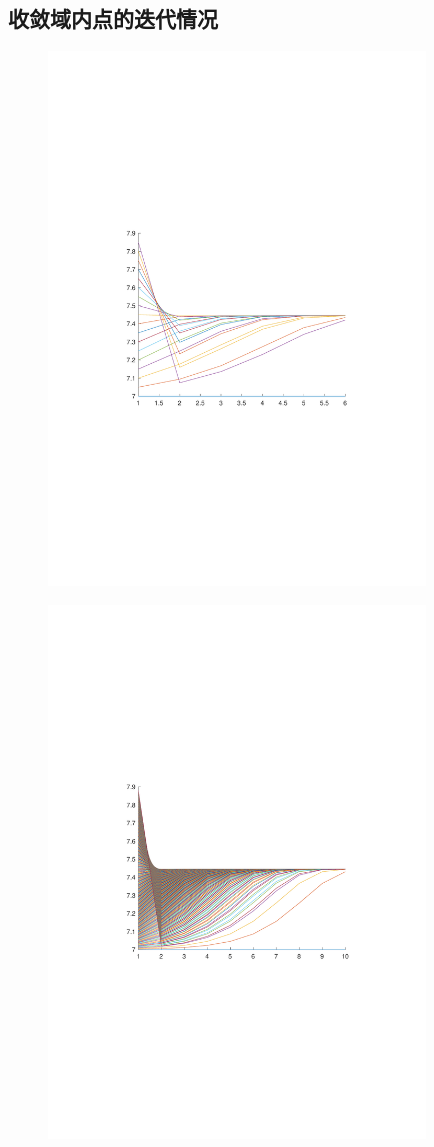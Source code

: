 \subsection{收敛域内点的迭代情况}
\begin{figure}[H]
\centering
\includegraphics[width=10cm]{fig/2_1.pdf}
\end{figure}

\begin{figure}[H]
\centering
\includegraphics[width=10cm]{fig/2_2.pdf}
\end{figure}

